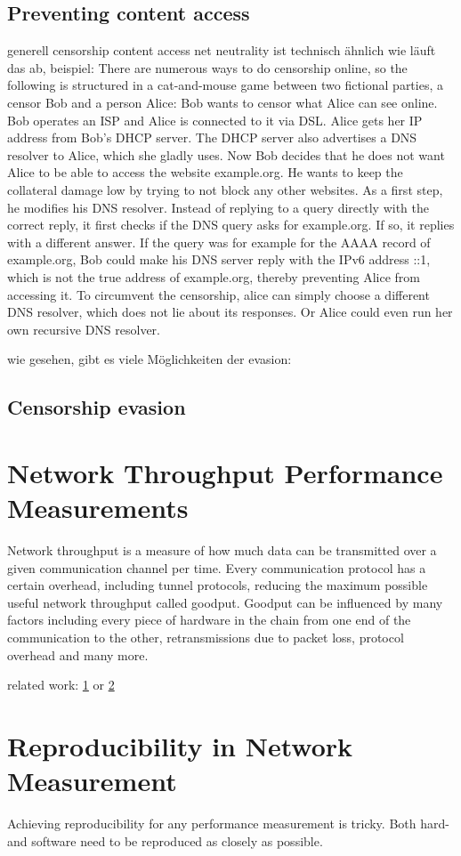 \subsection{Preventing content access}
generell censorship
content access
net neutrality
ist technisch ähnlich
wie läuft das ab, beispiel:
There are numerous ways to do censorship online, so the following is structured in a cat-and-mouse game between two fictional parties, a censor Bob and a person Alice:
Bob wants to censor what Alice can see online.
Bob operates an ISP and Alice is connected to it via DSL. Alice gets her IP address from Bob's DHCP server.
The DHCP server also advertises a DNS resolver to Alice, which she gladly uses.
Now Bob decides that he does not want Alice to be able to access the website example.org.
He wants to keep the collateral damage low by trying to not block any other websites.
As a first step, he modifies his DNS resolver.
Instead of replying to a query directly with the correct reply, it first checks if the DNS query asks for example.org.
If so, it replies with a different answer.
If the query was for example for the AAAA record of example.org, Bob could make his DNS server reply with the IPv6 address ::1, which is not the true address of example.org, thereby preventing Alice from accessing it.
To circumvent the censorship, alice can simply choose a different DNS resolver, which does not lie about its responses.
Or Alice could even run her own recursive DNS resolver.


wie gesehen, gibt es viele Möglichkeiten der evasion:

\subsection{Censorship evasion}

\section{Network Throughput Performance Measurements}
Network throughput is a measure of how much data can be transmitted over a given communication channel per time.
Every communication protocol has a certain overhead, including tunnel protocols, reducing the maximum possible useful network throughput called goodput.
Goodput can be influenced by many factors including every piece of hardware in the chain from one end of the communication to the other, retransmissions due to packet loss, protocol overhead and many more.

related work: \href{https://link.springer.com/chapter/10.1007/978-3-031-56252-5_12}{1} or \href{https://pam2024.cs.northwestern.edu/pdfs/paper-59.pdf}{2}

\section{Reproducibility in Network Measurement}
Achieving reproducibility for any performance measurement is tricky. Both hard- and software need to be reproduced as closely as possible.
